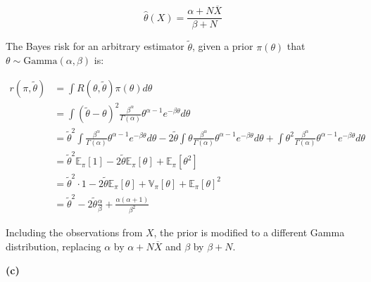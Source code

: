 \[ \hat{\theta}(X) = \frac{\alpha + N \overline{X}}{\beta + N} \]

The Bayes risk for an arbitrary estimator \(\tilde{\theta}\), given a
prior \(\pi(\theta)\) that \(\theta \sim \text{Gamma}(\alpha, \beta)\)
is:

\begin{align}
r(\pi, \tilde{\theta}) &= \int R(\theta, \tilde{\theta})\pi(\theta) d\theta \\
&= \int (\tilde{\theta} - \theta)^2 \frac{\beta^\alpha}{\Gamma(\alpha)} \theta^{\alpha - 1}e^{-\beta \theta} d\theta \\
&= \tilde{\theta}^2 \int \frac{\beta^\alpha}{\Gamma(\alpha)} \theta^{\alpha - 1}e^{-\beta \theta} d\theta
- 2 \tilde{\theta} \int \theta \frac{\beta^\alpha}{\Gamma(\alpha)} \theta^{\alpha - 1}e^{-\beta \theta} d\theta
+ \int \theta^2\frac{\beta^\alpha}{\Gamma(\alpha)} \theta^{\alpha - 1}e^{-\beta \theta} d\theta \\
&= \tilde{\theta}^2 \mathbb{E}_\pi[1] - 2 \tilde{\theta} \mathbb{E}_\pi[\theta] + \mathbb{E}_\pi[\theta^2] \\
&= \tilde{\theta}^2 \cdot 1 - 2 \tilde{\theta} \mathbb{E}_\pi[\theta] + \mathbb{V}_\pi[\theta] + \mathbb{E}_\pi[\theta]^2 \\
&= \tilde{\theta}^2 - 2 \tilde{\theta} \frac{\alpha}{\beta} + \frac{\alpha(\alpha + 1)}{\beta^2}
\end{align}

Including the observations from \(X\), the prior is modified to a
different Gamma distribution, replacing \(\alpha\) by
\(\alpha + N \overline{X}\) and \(\beta\) by \(\beta + N\).

\textbf{(c)}

